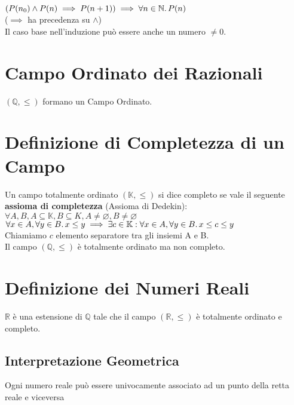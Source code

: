 \documentclass[a4paper, twoside, italian, 11pt]{book}
\newcommand{\N}{\mathbb{N}}
\newcommand{\Q}{\mathbb{Q}}
\newcommand{\K}{\mathbb{K}}
\newcommand{\R}{\mathbb{R}}
\let\emptyset\varnothing
\begin{document}
\indent
$(P(n_0) \land P(n) \implies P(n + 1)) \implies \forall n \in \N \ldotp P(n)$ \\

($\implies$ ha precedenza su $\land$) \\

\noindent
Il caso base nell'induzione può essere anche un numero $\neq 0$.



\section{Campo Ordinato dei Razionali}
\noindent
$(\Q, \leq)$ formano un Campo Ordinato.


\section{Definizione di Completezza di un Campo}

\noindent
Un campo totalmente ordinato $(\K, \leq)$ si dice completo se vale il seguente \textbf{assioma di completezza} (Assioma di Dedekin): \\

$\forall A, B, A \subseteq \K, B \subseteq K, A \neq \emptyset, B \neq \emptyset$ \\

$\forall x \in A, \forall y \in B \ldotp x \leq y \implies \exists c \in \K : \forall x \in A, \forall y \in B \ldotp x \leq c \leq y$ \\

\noindent
Chiamiamo $c$ elemento separatore tra gli insiemi A e B. \\

\noindent
Il campo $(\Q, \leq)$ è totalmente ordinato ma non completo.


\section{Definizione dei Numeri Reali}

\noindent
$\R$ è una estensione di $\Q$ tale che il campo $(\R, \leq)$ è totalmente ordinato e completo.


\subsection{Interpretazione Geometrica}

\noindent
Ogni numero reale può essere univocamente associato ad un punto della retta reale e viceversa
\end{document}
